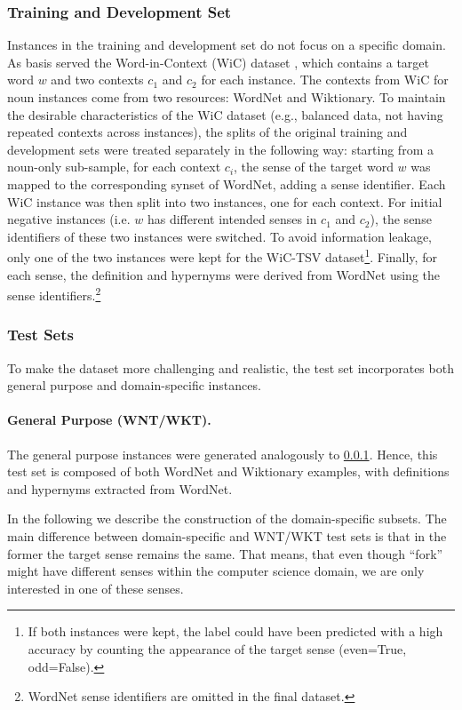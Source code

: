 \documentclass[11pt,a4paper]{article}
\begin{document}
\subsubsection{Training and Development Set}
\label{train+dev const}
Instances in the training and development set do not focus on a specific domain. 
As basis served the Word-in-Context (WiC) dataset \cite{pilehvar-camacho-collados-2019-wic}, which contains a target word $w$ and two contexts $c_1$ and $c_2$ for each instance. 
The contexts from WiC for noun instances come from two resources: WordNet and Wiktionary. 
To maintain the desirable characteristics of the WiC dataset (e.g., balanced data, not having repeated contexts across instances), the splits of the original training and development sets were treated separately in the following way: starting from a noun-only sub-sample, for each context $c_i$, the sense of the target word $w$ was mapped to the corresponding synset of WordNet, adding a sense identifier.
Each WiC instance was then split into two instances, one for each context.
For initial negative instances (i.e. $w$ has different intended senses in $c_1$ and $c_2$), the sense identifiers of these two instances were switched. To avoid information leakage, only one of the two instances were kept for the WiC-TSV dataset\footnote{If both instances were kept, the label could have been predicted with a high accuracy by counting the appearance of the target sense (even=True, odd=False).}. Finally, for each sense, the definition and hypernyms were derived from WordNet using the sense identifiers.\footnote{WordNet sense identifiers are omitted in the final dataset.}

\subsubsection{Test Sets}
\label{domain}

To make the dataset more challenging and realistic, the test set incorporates both general purpose and domain-specific instances. 


\paragraph{General Purpose (WNT/WKT).}
The general purpose instances were generated analogously to \ref{train+dev const}. Hence, this test set is composed of both WordNet and Wiktionary examples, with definitions and hypernyms extracted from WordNet.

In the following we describe the construction of the domain-specific subsets.
The main difference between domain-specific and WNT/WKT test sets is that in the former the target sense remains the same. That means, that even though ``fork'' might have different senses within the computer science domain, we are only interested in one of these senses.
\end{document}
